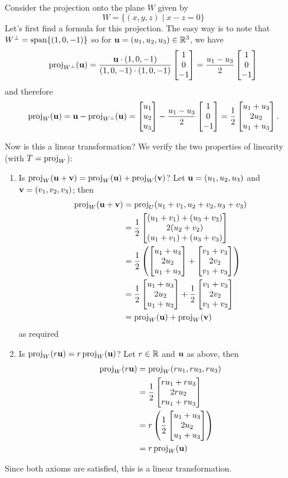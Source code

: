 \begin{myexample} Consider the projection onto the plane $W$ given by
$$
W = \{ (x,y,z) \mid x-z = 0\}
$$
Let's first find a formula for this projection.  The easy way
is to note that $W^\perp = \spn\{(1,0,-1)\}$ so for $\uu = (u_1,u_2,u_3)\in \R^3$, we have
$$
\proj_{W^\perp}(\uu) = \frac{\uu \cdot (1,0,-1)}{(1,0,-1)\cdot (1,0,-1)} \mat{1\\0\\-1}
= \frac{u_1-u_3}{2}\mat{1\\0\\-1}
$$
and therefore
$$
\proj_W(\uu) = \uu - \proj_{W^\perp}(\uu) =\mat{u_1\\u_2\\u_3} - \frac{u_1-u_3}{2}\mat{1\\0\\-1} = \frac12\mat{u_1+u_3\\ 2u_2 \\ u_1+u_3}.
$$

Now is this a linear transformation?  We verify the two properties of
linearity (with $T = \proj_W$):
\begin{enumerate}
\item Is $\proj_W(\uu + \vv) = \proj_W(\uu) + \proj_W(\vv)$?  Let $\uu = (u_1, u_2, u_3)$ and $\vv = (v_1, v_2, v_3)$; then
\begin{align*}
\proj_W(\uu + \vv) &= \proj_U(u_1+v_1,u_2+v_2,u_3+v_3) \\
&= \frac12\mat{ (u_1+v_1) + (u_3+v_3)\\ 2(u_2+v_2)\\  (u_1+v_1) + (u_3+v_3)}\\
&= \frac12\left( \mat{u_1+u_3\\2u_2\\u_1+u_3} + \mat{v_1+v_3\\2v_2\\v_1+v_3}\right) \\
&= \frac12\mat{u_1+u_3\\2u_2\\u_1+u_3} + \frac12\mat{v_1+v_3\\2v_2\\v_1+v_3}\\
&= \proj_W(\uu) + \proj_W(\vv)
\end{align*}
as required
\item Is $\proj_W(r\uu) = r\proj_W(\uu)$?  Let $r\in \R$ and $\uu$ as above,
then
\begin{align*}
\proj_W(r\uu) &= \proj_W(ru_1,ru_3,ru_3)\\
&= \frac12\mat{ru_1+ru_3\\ 2ru_2 \\ ru_1+ru_3}\\
&= r\left(\frac12\mat{u_1+u_3\\ 2u_2 \\ u_1+u_3}\right)\\
&= r\proj_W(\uu)
\end{align*}
\end{enumerate}
Since both axioms are satisfied, this is a linear transformation.
\end{myexample}

